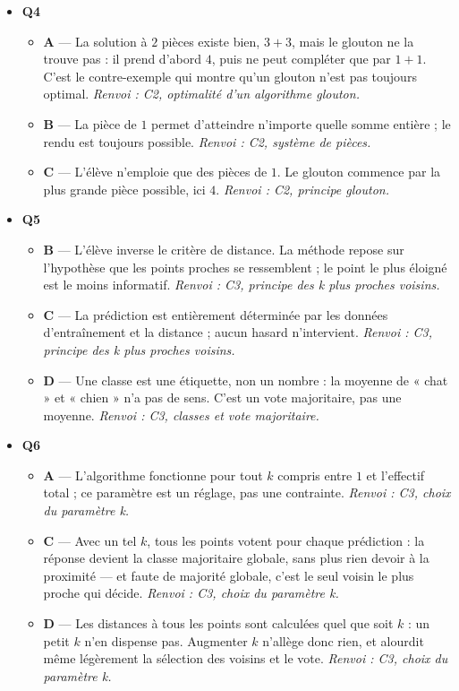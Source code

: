 \begin{itemize}
\begin{itemize}
    \item \textbf{D} — Le choix suit un critère explicite, par exemple la plus grande pièce disponible. Un glouton est déterministe. \emph{Renvoi : C2, principe glouton.}
  \end{itemize}
  \item \textbf{Q4}
  \begin{itemize}
    \item \textbf{A} — La solution à $2$ pièces existe bien, $3+3$, mais le glouton ne la trouve pas : il prend d'abord $4$, puis ne peut compléter que par $1+1$. C'est le contre-exemple qui montre qu'un glouton n'est pas toujours optimal. \emph{Renvoi : C2, optimalité d'un algorithme glouton.}
    \item \textbf{B} — La pièce de $1$ permet d'atteindre n'importe quelle somme entière ; le rendu est toujours possible. \emph{Renvoi : C2, système de pièces.}
    \item \textbf{C} — L'élève n'emploie que des pièces de $1$. Le glouton commence par la plus grande pièce possible, ici $4$. \emph{Renvoi : C2, principe glouton.}
  \end{itemize}
  \item \textbf{Q5}
  \begin{itemize}
    \item \textbf{B} — L'élève inverse le critère de distance. La méthode repose sur l'hypothèse que les points proches se ressemblent ; le point le plus éloigné est le moins informatif. \emph{Renvoi : C3, principe des k plus proches voisins.}
    \item \textbf{C} — La prédiction est entièrement déterminée par les données d'entraînement et la distance ; aucun hasard n'intervient. \emph{Renvoi : C3, principe des k plus proches voisins.}
    \item \textbf{D} — Une classe est une étiquette, non un nombre : la moyenne de « chat » et « chien » n'a pas de sens. C'est un vote majoritaire, pas une moyenne. \emph{Renvoi : C3, classes et vote majoritaire.}
  \end{itemize}
  \item \textbf{Q6}
  \begin{itemize}
    \item \textbf{A} — L'algorithme fonctionne pour tout $k$ compris entre $1$ et l'effectif total ; ce paramètre est un réglage, pas une contrainte. \emph{Renvoi : C3, choix du paramètre k.}
    \item \textbf{C} — Avec un tel $k$, tous les points votent pour chaque prédiction : la réponse devient la classe majoritaire globale, sans plus rien devoir à la proximité — et faute de majorité globale, c'est le seul voisin le plus proche qui décide. \emph{Renvoi : C3, choix du paramètre k.}
    \item \textbf{D} — Les distances à tous les points sont calculées quel que soit $k$ : un petit $k$ n'en dispense pas. Augmenter $k$ n'allège donc rien, et alourdit même légèrement la sélection des voisins et le vote. \emph{Renvoi : C3, choix du paramètre k.}
  \end{itemize}
\end{itemize}
\fi
